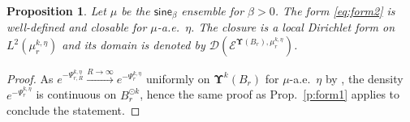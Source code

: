 \documentclass[11pt,letterpaper]{amsart}
\newcommand{\dom}[1]{\mathcal D(#1)}
\newcommand{\QP}{{\mu}}
\newcommand{\dUpsilon}{{\mathbf \Upsilon}}
\newcommand{\U}{\dUpsilon}
\newcommand{\sine}{\mathsf{sine}}
\newcommand{\E}{\mathcal E}
\renewcommand{\1}{\mathbf 1}
\numberwithin{equation}{section}
\theoremstyle{plain}
\newtheorem{prop}[thm]{Proposition}%
\theoremstyle{definition}
\theoremstyle{remark}
\newtheorem{rem}[thm]{\bf Remark}%
\renewcommand{\paragraph}[1]{\medskip\emph{#1}.\quad}
\begin{document}

\begin{prop}\label{p:form2}
Let $\QP$ be the $\sine_\beta$ ensemble for $\beta>0$. The form \eqref{eq:form2} is well-defined and closable for $\mu$-a.e.~$\eta$. The closure is a local Dirichlet form on~$L^2(\mu_{r}^{k, \eta})$ and its domain is denoted by $\dom{\E^{\U(B_r), \mu_{r}^{k, \eta}}}$. 
\end{prop}
\begin{proof}
As $e^{-\Psi_{r, R}^{k, \eta}} \xrightarrow{R \to \infty} e^{-\Psi_{r}^{k, \eta}}$ uniformly on $\U^k(B_r)$ for $\mu$-a.e.~$\eta$ by \cite[Lem.~2.3 and Proof of Thm.\ 2.1 in~p.~183]{DerHarLebMai20}, the density $e^{-\Psi_{r}^{k, \eta}}$ is continuous on $B_r^{\odot k}$, hence the same proof as Prop.~\ref{p:form1} applies to conclude the statement. 
\end{proof}

\end{document}

